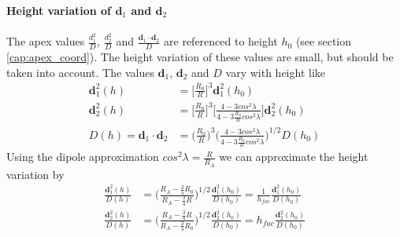 \paragraph{Height variation of $\mathbf{d}_1$ and $\mathbf{d}_2$ }
%
The apex values $\frac{d_1^2}{D}$, $\frac{d_2^2}{D}$ and $\frac{\mathbf{d}_1 \cdot
\mathbf{d}_2}{D}$ are referenced to height $h_0$ (see section \ref{cap:apex_coord}). 
The height variation of these values are
small, but should be taken into account. The values $\mathbf{d}_1$, $\mathbf{d}_2$
and $D$ vary with height like
%
\begin{align}
   \mathbf{d}_1^2(h) &= \bigl[ \frac{R_0}{R} \bigr]^3 \mathbf{d}_1^2(h_0)\\
   \mathbf{d}_2^2(h) &= \bigl[ \frac{R_0}{R} \bigr]^3 \bigl[ 
	   \frac{4-3cos^2 \lambda}{4-3 \frac{R_0}{R} cos^2 \lambda} \bigr]\mathbf{d}_2^2(h_0) \\
   D(h) = \mathbf{d}_1 \cdot \mathbf{d}_2
	      &= \bigl( \frac{R_0}{R} \bigr)^3  \bigl(\frac{4-3cos^2 \lambda}
		     {4-3 \frac{R_0}{R} cos^2 \lambda} \bigr)^{1/2} D(h_0)
\end{align}
%
Using the dipole approximation $cos^2 \lambda = \frac{R}{R_A}$ we can approximate
the height variation by
%
\begin{align}
   \frac{\mathbf{d}_1^2(h)}{D(h)} &= \bigl( \frac{R_A-\frac{3}{4} R_0}
                     {R_A-\frac{3}{4} R} \bigr)^{1/2}\frac{\mathbf{d}_1^2(h_0)}{D(h_0)} = 
		     \frac{1}{h_{fac}}\frac{\mathbf{d}_1^2(h_0)}{D(h_0)}
		     \label{eq:d_hgt1a}\\
   \frac{\mathbf{d}_2^2(h)}{D(h)} &= \bigl(\frac{R_A-\frac{3}{4} R}
                     {R_A-\frac{3}{4} R_0} \bigr)^{1/2}\frac{\mathbf{d}_2^2(h_0)}{D(h_0)}  = 
		     h_{fac}\frac{\mathbf{d}_2^2(h_0)}{D(h_0)}  \label{eq:d_hgt1b}
\end{align}
%
%
